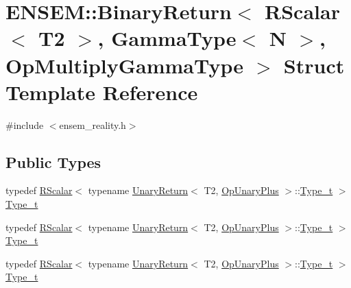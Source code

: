 \hypertarget{structENSEM_1_1BinaryReturn_3_01RScalar_3_01T2_01_4_00_01GammaType_3_01N_01_4_00_01OpMultiplyGammaType_01_4}{}\section{E\+N\+S\+EM\+:\+:Binary\+Return$<$ R\+Scalar$<$ T2 $>$, Gamma\+Type$<$ N $>$, Op\+Multiply\+Gamma\+Type $>$ Struct Template Reference}
\label{structENSEM_1_1BinaryReturn_3_01RScalar_3_01T2_01_4_00_01GammaType_3_01N_01_4_00_01OpMultiplyGammaType_01_4}


{\ttfamily \#include $<$ensem\+\_\+reality.\+h$>$}

\subsection*{Public Types}
\begin{DoxyCompactItemize}
\item 
typedef \mbox{\hyperlink{classENSEM_1_1RScalar}{R\+Scalar}}$<$ typename \mbox{\hyperlink{structENSEM_1_1UnaryReturn}{Unary\+Return}}$<$ T2, \mbox{\hyperlink{structENSEM_1_1OpUnaryPlus}{Op\+Unary\+Plus}} $>$\+::\mbox{\hyperlink{structENSEM_1_1BinaryReturn_3_01RScalar_3_01T2_01_4_00_01GammaType_3_01N_01_4_00_01OpMultiplyGammaType_01_4_a955e89f0808a9e6fa6129e9fb9f12d6b}{Type\+\_\+t}} $>$ \mbox{\hyperlink{structENSEM_1_1BinaryReturn_3_01RScalar_3_01T2_01_4_00_01GammaType_3_01N_01_4_00_01OpMultiplyGammaType_01_4_a955e89f0808a9e6fa6129e9fb9f12d6b}{Type\+\_\+t}}
\item 
typedef \mbox{\hyperlink{classENSEM_1_1RScalar}{R\+Scalar}}$<$ typename \mbox{\hyperlink{structENSEM_1_1UnaryReturn}{Unary\+Return}}$<$ T2, \mbox{\hyperlink{structENSEM_1_1OpUnaryPlus}{Op\+Unary\+Plus}} $>$\+::\mbox{\hyperlink{structENSEM_1_1BinaryReturn_3_01RScalar_3_01T2_01_4_00_01GammaType_3_01N_01_4_00_01OpMultiplyGammaType_01_4_a955e89f0808a9e6fa6129e9fb9f12d6b}{Type\+\_\+t}} $>$ \mbox{\hyperlink{structENSEM_1_1BinaryReturn_3_01RScalar_3_01T2_01_4_00_01GammaType_3_01N_01_4_00_01OpMultiplyGammaType_01_4_a955e89f0808a9e6fa6129e9fb9f12d6b}{Type\+\_\+t}}
\item 
typedef \mbox{\hyperlink{classENSEM_1_1RScalar}{R\+Scalar}}$<$ typename \mbox{\hyperlink{structENSEM_1_1UnaryReturn}{Unary\+Return}}$<$ T2, \mbox{\hyperlink{structENSEM_1_1OpUnaryPlus}{Op\+Unary\+Plus}} $>$\+::\mbox{\hyperlink{structENSEM_1_1BinaryReturn_3_01RScalar_3_01T2_01_4_00_01GammaType_3_01N_01_4_00_01OpMultiplyGammaType_01_4_a955e89f0808a9e6fa6129e9fb9f12d6b}{Type\+\_\+t}} $>$ \mbox{\hyperlink{structENSEM_1_1BinaryReturn_3_01RScalar_3_01T2_01_4_00_01GammaType_3_01N_01_4_00_01OpMultiplyGammaType_01_4_a955e89f0808a9e6fa6129e9fb9f12d6b}{Type\+\_\+t}}
\end{DoxyCompactItemize}


